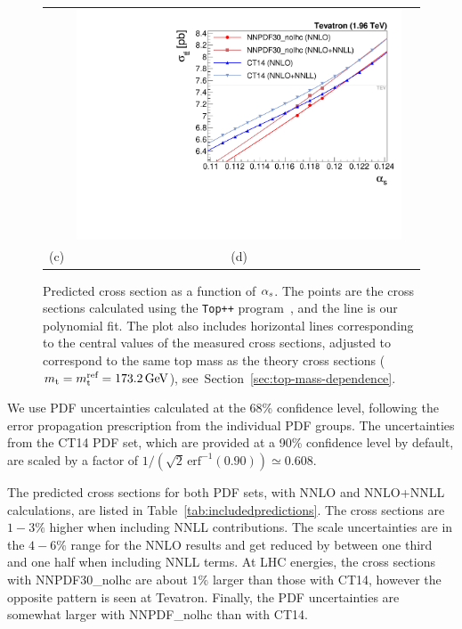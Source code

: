 \begin{figure}[t]
\begin{tabular}{ccc}
&
\includegraphics[width=\FitFigureWidth\linewidth]{img/alphas/fits_TEV1960.pdf}
\\[-8pt]
(c) & (d) \\[6pt]
\end{tabular}
\vspace{-0.3cm}
\caption{
  Predicted cross section as a function of $\alpha_s$. The points are the cross
  sections calculated using the \texttt{Top++} program~\cite{Czakon:2011xx}, and
  the line is our polynomial fit.
  The plot also includes horizontal lines corresponding to the central
  values of the measured cross sections, adjusted to correspond to the
  same top mass as the theory cross sections ($m_{\mathrm{t}} = m_{\mathrm{t}}^\text{ref} =
  173.2\,\text{GeV}$), see~Section~\ref{sec:top-mass-dependence}.
}
\label{fig:FitsToPrediction}
\end{figure}
% 

We use PDF uncertainties calculated at the 68\% confidence level,
following the error propagation prescription from the individual PDF
groups.
%
The uncertainties from the CT14 PDF set, which are provided at a 90\%
confidence level by default, are scaled by a factor of
$1/(\sqrt2 \, \text{erf}^{-1}( 0.90) )\simeq 0.608 $.

The predicted cross sections for both PDF sets, with NNLO and
NNLO+NNLL calculations, are listed in
Table~\ref{tab:includedpredictions}.
%
The cross sections are $1{-}3\%$ higher when including NNLL
contributions.
%
The scale uncertainties are in the $4{-}6\%$ range for the NNLO
results and get reduced by between one third and one half when
including NNLL terms.
%
At LHC energies, the cross sections with NNPDF30\_nolhc are about $1\%$ larger
than those with CT14, however the opposite pattern is seen at
Tevatron. 
%
Finally, the PDF uncertainties are somewhat larger with NNPDF\_nolhc than
with CT14.

